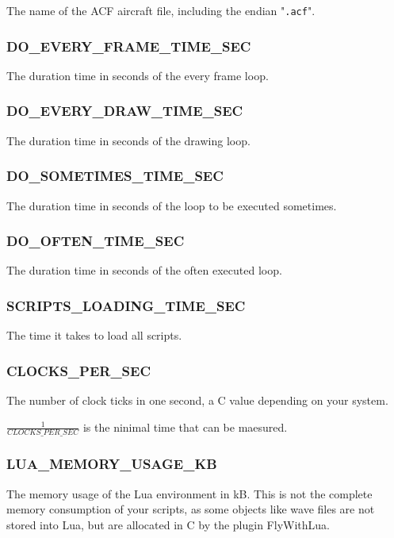 \documentclass[11pt,parskip=half,a4paper]{scrartcl}
\begin{document}
The name of the ACF aircraft file, including the endian "\verb|.acf|".

\subsubsection{DO\_EVERY\_FRAME\_TIME\_SEC}

The duration time in seconds of the every frame loop.

\subsubsection{DO\_EVERY\_DRAW\_TIME\_SEC}

The duration time in seconds of the drawing loop.

\subsubsection{DO\_SOMETIMES\_TIME\_SEC}

The duration time in seconds of the loop to be executed sometimes.

\subsubsection{DO\_OFTEN\_TIME\_SEC}

The duration time in seconds of the often executed loop.

\subsubsection{SCRIPTS\_LOADING\_TIME\_SEC}

The time it takes to load all scripts.

\subsubsection{CLOCKS\_PER\_SEC}

The number of clock ticks in one second, a C value depending on your system.

$\frac{1}{CLOCKS\_PER\_SEC}$ is the ninimal time that can be maesured.

\subsubsection{LUA\_MEMORY\_USAGE\_KB}

The memory usage of the Lua environment in kB. This is not the complete memory consumption of your scripts, as some objects like wave files are not stored into Lua, but are allocated in C by the plugin FlyWithLua.
\end{document}
